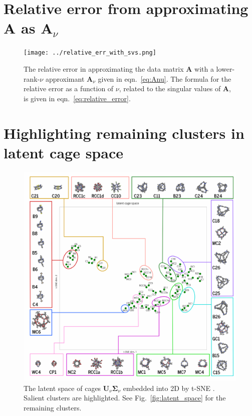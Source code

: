 \documentclass[journal=jacsat,manuscript=article]{achemso}
\begin{document}
\newpage
\clearpage

\section{Relative error from approximating $\mathbf{A}$ as $\mathbf{A}_\nu$}

\begin{figure}
\centering
	\texttt{[image: ../relative\_err\_with\_svs.png]}
	\caption{The relative error in approximating the data matrix $\mathbf{A}$ with a lower-rank-$\nu$ approximant $\mathbf{A}_\nu$ given in eqn.~\ref{eq:Anu}. The formula for the relative error as a function of $\nu$, related to the singular values of $\mathbf{A}$, is given in eqn.~\ref{eq:relative_error}.
	} \label{fig:relative_err_with_svs}
\end{figure}

\newpage
\clearpage

\section{Highlighting remaining clusters in latent cage space}

\begin{figure}[h!]
\centering
	\includegraphics[width=0.9\columnwidth]{../latent_cage_space_2D_marked_SI.pdf}
	\caption{The latent space of cages $\mathbf{U}_\nu \mathbf{\Sigma}_\nu$ embedded into 2D by t-SNE \cite{maaten2008visualizing,wattenberg2016how}. Salient clusters are highlighted. See Fig.~\ref{fig:latent_space} for the remaining clusters.
	} \label{fig:latent_space2}
\end{figure}
\end{document}
